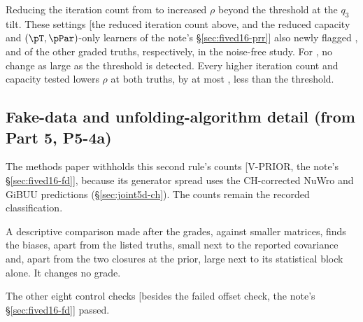 Reducing the iteration count from  to  increased $\rho$ beyond the threshold at the $q_3$ tilt. These settings [the reduced iteration count above, and the reduced capacity and $(\pT,\pPar)$-only learners of the note's \S\ref{sec:fived16-prr}] also newly flagged ,  and  of the other  graded truths, respectively, in the noise-free study. For , no change as large as the threshold is detected. Every higher iteration count and capacity tested lowers $\rho$ at both truths, by at most , less than the threshold.

\subsection{Fake-data and unfolding-algorithm detail (from Part 5, P5-4a)}

The methods paper withholds this second rule's counts [V-PRIOR, the note's \S\ref{sec:fived16-fd}], because its generator spread uses the CH-corrected NuWro and GiBUU predictions (\S\ref{sec:joint5d-ch}). The counts remain the recorded classification.

A descriptive comparison made after the grades, against smaller matrices, finds the biases, apart from the listed truths, small next to the reported covariance and, apart from the two closures at the prior, large next to its statistical block alone. It changes no grade.

The other eight control checks [besides the failed offset check, the note's \S\ref{sec:fived16-fd}] passed.


